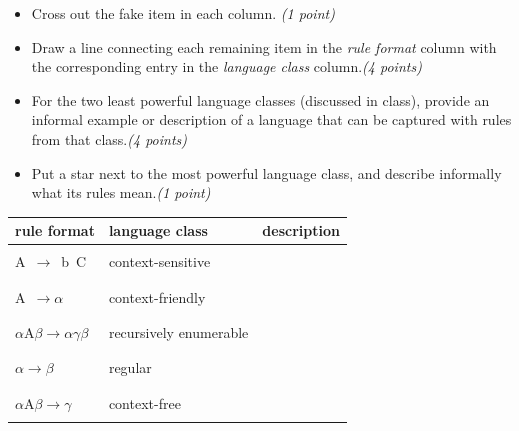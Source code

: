 \documentclass[12pt]{article}
\begin{document}
\begin{itemize}
\begin{itemize}
    \item[a.] Cross out the fake item in each column. \hfill{\em (1 point)}

    \item[b.] Draw a line connecting each remaining item in the \emph{rule format} column with the corresponding entry in the \emph{language class} column.\hfill{\em (4 points)}

    \item[c.] For the two least powerful language classes (discussed in class), provide an informal example or description of a language that can be captured with rules from that class.\hfill{\em (4 points)}

    \item[d.] Put a star next to the most powerful language class, and describe informally what its rules mean.\hfill{\em (1 point)}
\end{itemize}
    
\begin{table}[h]
\centering
\begin{tabular}{|p{1in}|p{2in}|p{2.5in}|}
\toprule
\textbf{rule format} 
& \textbf{language class}
& \textbf{description} \\
\midrule
& & \\
A\ $\rightarrow$\ b\ C
& context-sensitive & \\
& & \\
& & \\
A\ $\rightarrow\alpha$
& context-friendly & \\
& & \\
& & \\
$\alpha$A$\beta\rightarrow\alpha\gamma\beta$
& recursively enumerable & \\
& & \\
& & \\
$\alpha\rightarrow\beta$
& regular & \\
& & \\
& & \\
$\alpha$A$\beta\rightarrow \gamma$
& context-free & \\ 
& & \\
\bottomrule
\end{tabular}
\end{table}


\end{itemize}
\end{document}
